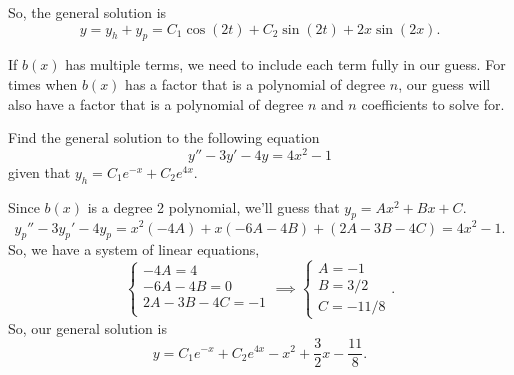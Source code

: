\noindent
So, the general solution is
\begin{equation*}
	y = y_h + y_p = C_1\cos{(2t)} + C_2\sin{(2t)} + 2x\sin{(2x)}.
\end{equation*}

\noindent
If $b(x)$ has multiple terms, we need to include each term fully in our guess.
For times when $b(x)$ has a factor that is a polynomial of degree $n$, our guess will also have a factor that is a polynomial of degree $n$ and $n$ coefficients to solve for.
\begin{example}
	Find the general solution to the following equation
	\begin{equation*}
		y'' - 3y' - 4y = 4x^2 - 1
	\end{equation*}
	given that $y_h = C_1e^{-x} + C_2e^{4x}$.
\end{example}
\noindent
Since $b(x)$ is a degree 2 polynomial, we'll guess that $y_p = Ax^2 + Bx + C$.
\begin{equation*}
	y_p'' - 3y_p' - 4y_p = x^2(-4A) + x(-6A-4B) + (2A-3B-4C) = 4x^2 - 1.
\end{equation*}
So, we have a system of linear equations,
\begin{equation*}
	\begin{cases}
		-4A = 4 \\
		-6A - 4B = 0 \\
		2A - 3B - 4C = -1 \\
	\end{cases} \implies \begin{cases}
		A = -1 \\
		B = 3/2 \\
		C = -11/8
	\end{cases}.
\end{equation*}
So, our general solution is
\begin{equation*}
	y = C_1e^{-x} + C_2e^{4x} - x^2 + \frac{3}{2}x - \frac{11}{8}.
\end{equation*}